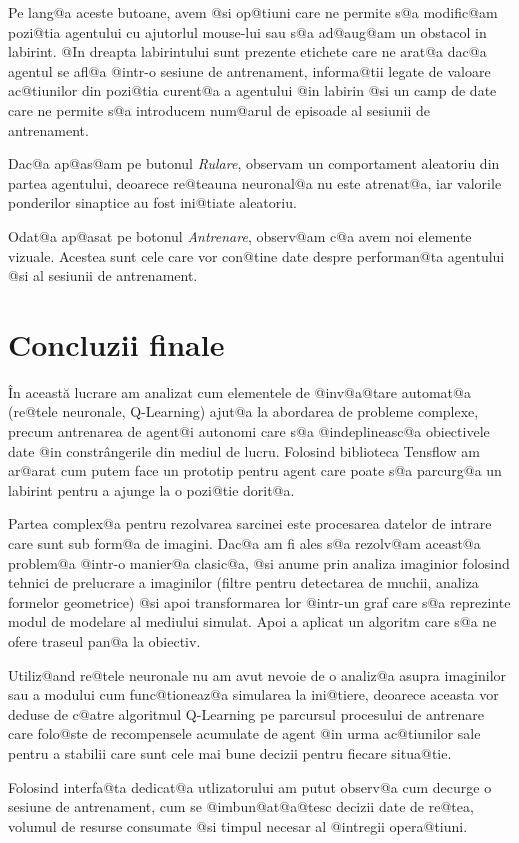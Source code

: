 Pe lang@a aceste butoane, avem @si op@tiuni care ne permite s@a modific@am pozi@tia agentului cu ajutorlul mouse-lui sau s@a ad@aug@am un obstacol in labirint. @In dreapta labirintului sunt prezente etichete care ne arat@a dac@a agentul se afl@a @intr-o sesiune de antrenament, informa@tii legate de valoare ac@tiunilor din pozi@tia curent@a a agentului @in labirin @si un camp de date care ne permite s@a introducem num@arul de episoade al sesiunii de antrenament.

Dac@a ap@as@am pe butonul \textsl{Rulare}, observam un comportament aleatoriu din partea agentului, deoarece re@teauna neuronal@a nu este atrenat@a, iar valorile ponderilor sinaptice au fost ini@tiate aleatoriu.

Odat@a ap@asat pe botonul \textsl{Antrenare}, observ@am c@a avem noi elemente vizuale. Acestea sunt cele care vor con@tine date despre performan@ta agentului @si al sesiunii de antrenament.  


\chapter*{Concluzii finale}



\^ In aceast\u a lucrare am analizat cum elementele de @inv@a@tare automat@a (re@tele neuronale, Q-Learning) ajut@a la abordarea de probleme complexe, precum antrenarea de agent@i autonomi care s@a @indeplineasc@a obiectivele date @in constr\^ angerile din mediul de lucru. Folosind biblioteca Tensflow am ar@arat cum putem face un prototip pentru agent care poate s@a parcurg@a un labirint pentru a ajunge la o pozi@tie dorit@a. 

Partea complex@a pentru rezolvarea sarcinei este procesarea datelor de intrare care sunt sub form@a de imagini. Dac@a am fi ales s@a rezolv@am aceast@a problem@a @intr-o manier@a clasic@a, @si anume prin analiza imaginior folosind tehnici de prelucrare a imaginilor (filtre pentru detectarea de muchii, analiza formelor geometrice) @si apoi transformarea lor @intr-un graf care s@a reprezinte modul de modelare al mediului simulat. Apoi a aplicat un algoritm care s@a ne ofere traseul pan@a la obiectiv.

Utiliz@and re@tele neuronale nu am avut nevoie de o analiz@a asupra imaginilor sau a modului cum func@tioneaz@a simularea la ini@tiere, deoarece aceasta vor deduse de c@atre algoritmul Q-Learning pe parcursul procesului de antrenare care folo@ste de recompensele acumulate de agent @in urma ac@tiunilor sale pentru a stabilii care sunt cele mai bune decizii pentru fiecare situa@tie.

Folosind interfa@ta dedicat@a utlizatorului am putut observ@a cum decurge o sesiune de antrenament, cum se @imbun@at@a@tesc decizii date de re@tea, volumul de resurse consumate @si timpul necesar al @intregii opera@tiuni.
